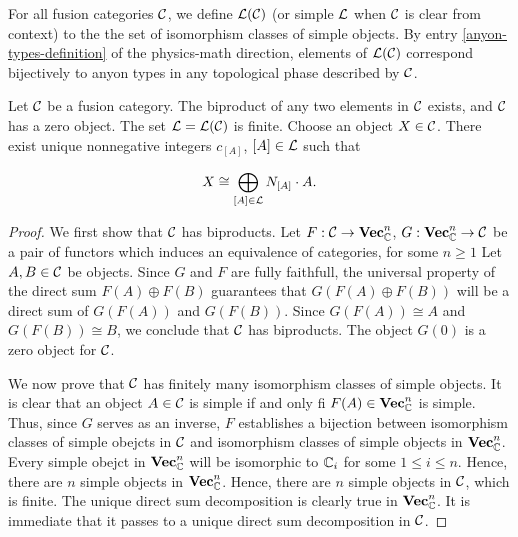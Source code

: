 \begin{defn} For all fusion categories ${\mathcal C}$, we define ${\mathcal L}({\mathcal C})$ (or simple ${\mathcal L}$ when ${\mathcal C}$ is clear from context) to the the set of isomorphism classes of simple objects. By entry \ref{anyon-types-definition} of the physics-math direction, elements of ${\mathcal L}({\mathcal C})$ correspond bijectively to anyon types in any topological phase described by ${\mathcal C}$.
\end{defn}

\begin{prop}\label{fusion-category-simples} Let ${\mathcal C}$ be a fusion category. The biproduct of any two elements in ${\mathcal C}$ exists, and ${\mathcal C}$ has a zero object. The set ${\mathcal L}={\mathcal L}({\mathcal C})$ is finite. Choose an object $X\in {\mathcal C}$. There exist unique nonnegative integers $c_{[A]}$, $[A]\in {\mathcal L}$ such that 

$$X\cong \bigoplus_{[A]\in {\mathcal L}}N_{[A]}\cdot A.$$
\end{prop}
\begin{proof} We first show that ${\mathcal C}$ has biproducts. Let $F:{\mathcal C}\to {\bf Vec}_{{\mathbb C}}^n$, $G:{\bf Vec}_{{\mathbb C}}^n\to {\mathcal C}$ be a pair of functors which induces an equivalence of categories, for some $n\geq 1$ Let $A,B\in {\mathcal C}$ be objects. Since $G$ and $F$ are fully faithfull, the universal property of the direct sum $F(A)\oplus F(B)$ guarantees that $G(F(A)\oplus F(B))$ will be a direct sum of $G(F(A))$ and $G(F(B))$. Since $G(F(A))\cong A$ and $G(F(B))\cong B$, we conclude that ${\mathcal C}$ has biproducts. The object $G(0)$ is a zero object for ${\mathcal C}$.

We now prove that ${\mathcal C}$ has finitely many isomorphism classes of simple objects. It is clear that an object $A\in {\mathcal C}$ is simple if and only fi $F(A)\in {\bf Vec}_{{\mathbb C}}^n$ is simple. Thus, since $G$ serves as an inverse, $F$ establishes a bijection between isomorphism classes of simple obejcts in ${\mathcal C}$ and isomorphism classes of simple objects in ${\bf Vec}_{{\mathbb C}}^n$. Every simple obejct in ${\bf Vec}_{{\mathbb C}}^n$ will be isomorphic to ${\mathbb C}_i$ for some $1\leq i \leq n$. Hence, there are $n$ simple objects in ${\bf Vec}_{{\mathbb C}}^n$. Hence, there are $n$ simple objects in ${\mathcal C}$, which is finite. The unique direct sum decomposition is clearly true in ${\bf Vec}_{{\mathbb C}}^n$. It is immediate that it passes to a unique direct sum decomposition in ${\mathcal C}$.
\end{proof}

